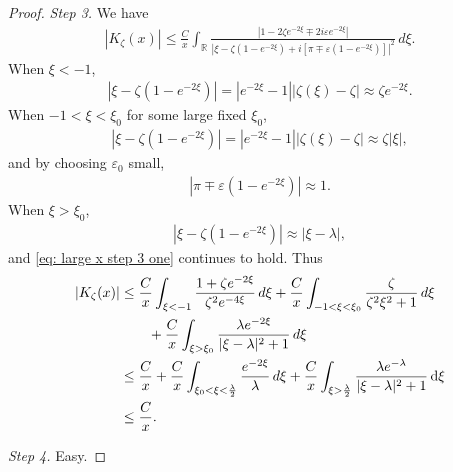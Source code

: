 \documentclass[GreensFunctions.tex]{subfiles}
\begin{document}
\begin{proof}
	{\em Step 3.} 
	We have
	\begin{align*}
		\left|K_\zeta(x)\right|
			\le \frac Cx
			\int_{\mathbb R} 
				\frac{|1-2\zeta e^{-2\xi}\mp 2i\varepsilon e^{-2\xi}|}
					{|\xi-\zeta(1-e^{-2\xi})+i[\pi\mp\varepsilon (1-e^{-2\xi})]|^2}
			\,d\xi.
	\end{align*}
	When $\xi<-1$, 
	\begin{align*}
		|\xi-\zeta(1-e^{-2\xi})| 
			= |e^{-2\xi}-1||\zeta(\xi)-\zeta|\approx \zeta e^{-2\xi}.
	\end{align*}
	When $-1<\xi<\xi_0$ for some large fixed $\xi_0$,
	\begin{align*}
		|\xi-\zeta(1-e^{-2\xi})| 
			= |e^{-2\xi}-1||\zeta(\xi)-\zeta|\approx\zeta |\xi|,
	\end{align*}
	and by choosing $\varepsilon_0$ small,
	\begin{align}
		\label{eq: large x step 3 one}
		|\pi\mp\varepsilon (1-e^{-2\xi})|\approx 1.
	\end{align}
	When $\xi>\xi_0$, 
	\begin{align*}
		|\xi-\zeta(1-e^{-2\xi})|\approx |\xi-\lambda|,
	\end{align*}
	and \eqref{eq: large x step 3 one} continues to hold. Thus
	\begin{align}
		\left|K_\zeta(x)\right| 
			&\le 
				\frac Cx 
				\int_{\xi<-1}
					\frac{1+\zeta e^{-2\xi}}{\zeta^2 e^{-4\xi}}
				\,d\xi 
				+ \frac Cx 
				\int_{-1<\xi<\xi_0}
					\frac{\zeta}{\zeta^2\xi^2+1}
				\,d\xi 
				\notag\\
			&\qquad+ 
				\frac C x
				\int_{\xi>\xi_0}
					\frac{\lambda e^{-2\xi}}{|\xi-\lambda|^2+1}
				\,d\xi\\
			&\le 
				\frac{C}{x} 
				+\frac{C}{x} 
				\int_{\xi_0<\xi<\frac\lambda 2}
					\frac{e^{-2\xi}}{\lambda}
				\,d\xi 
				+ \frac Cx 
				\int_{\xi>\frac\lambda 2} 
					\frac{\lambda e^{-\lambda}}{|\xi-\lambda|^2+1}
				\, \mathrm{d}\xi 
				\label{eq: x large step 3 two}\\
			&\le 
				\frac Cx.
	\end{align}



	{\em Step 4.} 
	Easy.



\end{proof}
\end{document}
